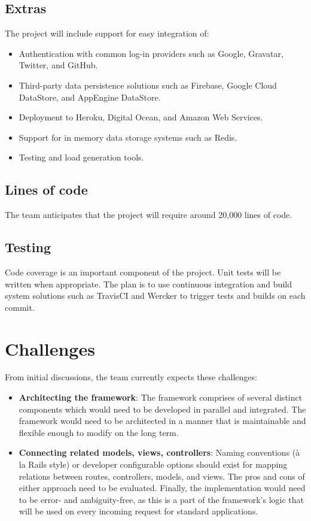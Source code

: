 \documentclass{article}
\begin{document}
\subsection{Extras}

The project will include support for easy integration of:

\begin{itemize}
    \item Authentication with common log-in providers such as Google, Gravatar, Twitter, and GitHub.
    \item Third-party data persistence solutions such as Firebase, Google Cloud DataStore, and AppEngine DataStore.
    \item Deployment to Heroku, Digital Ocean, and Amazon Web Services.
    \item Support for in memory data storage systems such as Redis.
    \item Testing and load generation tools.
\end{itemize}

\subsection{Lines of code}

The team anticipates that the project will require around 20,000 lines of code.

\subsection{Testing}

Code coverage is an important component of the project. Unit tests will be written when appropriate. The plan is to use continuous integration and build system solutions such as TravisCI and Wercker to trigger tests and builds on each commit.

\section{Challenges}

From initial discussions, the team currently expects these challenges:

\begin{itemize}
    \item \textbf{Architecting the framework}: The framework comprises of several distinct components which would need to be developed in parallel and integrated. The framework would need to be architected in a manner that is maintainable and flexible enough to modify on the long term.
    \item \textbf{Connecting related models, views, controllers}: Naming conventions (à la Rails style) or developer configurable options should exist for mapping relations between routes, controllers, models, and views. The pros and cons of either approach need to be evaluated. Finally, the implementation would need to be error- and ambiguity-free, as this is a part of the framework's logic that will be used on every incoming request for standard applications.
\end{itemize}
\end{document}
